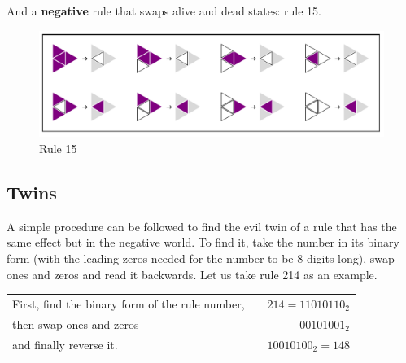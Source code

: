 \documentclass{article}
\begin{document}
\noindent And a \textbf{negative} rule that swaps alive and dead states: rule 15.
\begin{figure}[H]
    \centering
        \includegraphics[width=.5\textwidth]{graphics/behavior/boring-rules/rule-15.pdf}
    \caption{Rule 15}
    \label{fig:rule-plot-1(}
\end{figure}

\subsection{Twins} \label{twins}
A simple procedure can be followed to find the evil twin of a rule that has the same effect but in the negative world. To find it, take the number in its binary form (with the leading zeros needed for the number to be 8 digits long), swap ones and zeros and read it backwards. Let us take rule 214 as an example. \\

\begin{tabular}{l c r}
     First, find the binary form of the rule number, 
     & & $214=11010110_2$ \\
     then swap ones and zeros
     & & $00101001_2$ \\
     and finally reverse it.
     & & $10010100_2=148$
\end{tabular}
\end{document}

